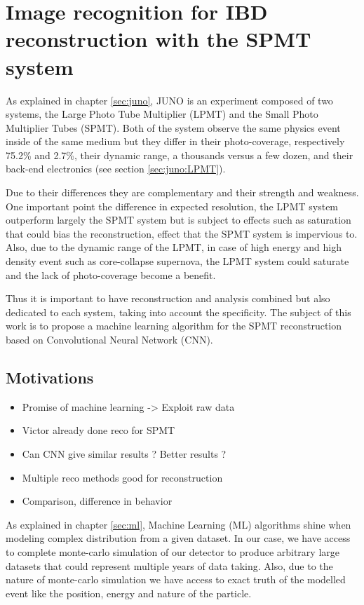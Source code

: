 \chapter{Image recognition for IBD reconstruction with the SPMT system}
\label{sec:jcnn}

As explained in chapter \ref{sec:juno}, JUNO is an experiment composed of two systems, the Large Photo Tube Multiplier (LPMT) and the Small Photo Multiplier Tubes (SPMT). Both of the system observe the same physics event inside of the same medium but they differ in their photo-coverage, respectively 75.2\% and 2.7\%, their dynamic range, a thousands versus a few dozen, and their back-end electronics (see section \ref{sec:juno:LPMT}).

Due to their differences they are complementary and their strength and weakness. One important point the difference in expected resolution, the LPMT system outperform largely the SPMT system but is subject to effects such as saturation \cite{juno_collaboration_calibration_2021} that could bias the reconstruction, effect that the SPMT system is impervious to. Also, due to the dynamic range of the LPMT, in case of high energy and high density event such as core-collapse supernova, the LPMT system could saturate and the lack of photo-coverage become a benefit.

Thus it is important to have reconstruction and analysis combined but also dedicated to each system, taking into account the specificity. The subject of this work is to propose a machine learning algorithm for the SPMT reconstruction based on Convolutional Neural Network (CNN).

\section{Motivations}

\begin{itemize}
  \item Promise of machine learning -> Exploit raw data
  \item Victor already done reco for SPMT
  \item Can CNN give similar results ? Better results ?
  \item Multiple reco methods good for reconstruction
  \item Comparison, difference in behavior
\end{itemize}

As explained in chapter \ref{sec:ml}, Machine Learning (ML) algorithms shine when modeling complex distribution from a given dataset. In our case, we have access to complete monte-carlo simulation of our detector to produce arbitrary large datasets that could represent multiple years of data taking. Also, due to the nature of monte-carlo simulation we have access to exact truth of the modelled event like the position, energy and nature of the particle.

